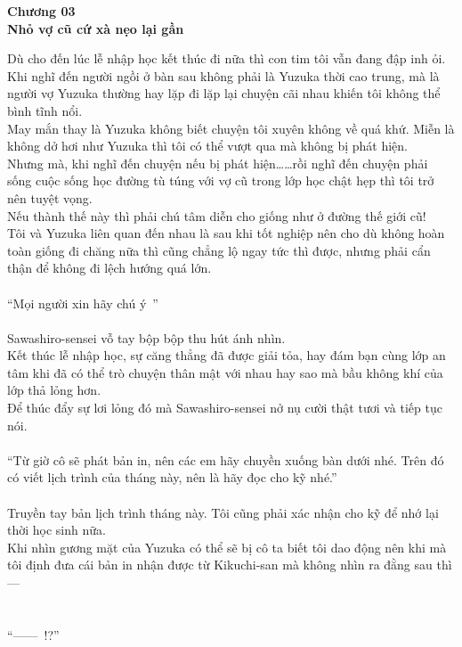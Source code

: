 \documentclass[12pt,a4paper, twosides]{book}
\begin{document}
    \begin{center}
    \textbf{\large Chương 03 \\ Nhỏ vợ cũ cứ xà nẹo lại gần}
    \end{center}
    \noindent
Dù cho đến lúc lễ nhập học kết thúc đi nữa thì con tim tôi vẫn đang đập inh ỏi.\\
Khi nghĩ đến người ngồi ở bàn sau không phải là Yuzuka thời cao trung, mà là người vợ Yuzuka thường hay lặp đi lặp lại chuyện cãi nhau khiến tôi không thể bình tĩnh nổi.\\
May mắn thay là Yuzuka không biết chuyện tôi xuyên không về quá khứ. Miễn là không dở hơi như Yuzuka thì tôi có thể vượt qua mà không bị phát hiện.\\
Nhưng mà, khi nghĩ đến chuyện nếu bị phát hiện……rồi nghĩ đến chuyện phải sống cuộc sống học đường tù túng với vợ cũ trong lớp học chật hẹp thì tôi trở nên tuyệt vọng.\\
Nếu thành thế này thì phải chú tâm diễn cho giống như ở đường thế giới cũ!\\
Tôi và Yuzuka liên quan đến nhau là sau khi tốt nghiệp nên cho dù không hoàn toàn giống đi chăng nữa thì cũng chẳng lộ ngay tức thì được, nhưng phải cẩn thận để không đi lệch hướng quá lớn.\\
\\
“Mọi người xin hãy chú ý~”\\
\\
Sawashiro-sensei vỗ tay bộp bộp thu hút ánh nhìn.\\
Kết thúc lễ nhập học, sự căng thẳng đã được giải tỏa, hay đám bạn cùng lớp an tâm khi đã có thể trò chuyện thân mật với nhau hay sao mà bầu không khí của lớp thả lỏng hơn.\\
Để thúc đẩy sự lơi lỏng đó mà Sawashiro-sensei nở nụ cười thật tươi và tiếp tục nói.\\
\\
“Từ giờ cô sẽ phát bản in, nên các em hãy chuyền xuống bàn dưới nhé. Trên đó có viết lịch trình của tháng này, nên là hãy đọc cho kỹ nhé.”\\
\\
Truyền tay bản lịch trình tháng này. Tôi cũng phải xác nhận cho kỹ để nhớ lại thời học sinh nữa.\\
Khi nhìn gương mặt của Yuzuka có thể sẽ bị cô ta biết tôi dao động nên khi mà tôi định đưa cái bản in nhận được từ Kikuchi-san mà không nhìn ra đằng sau thì—\\
~\\
\\
“——~!?”\\
\end{document}
